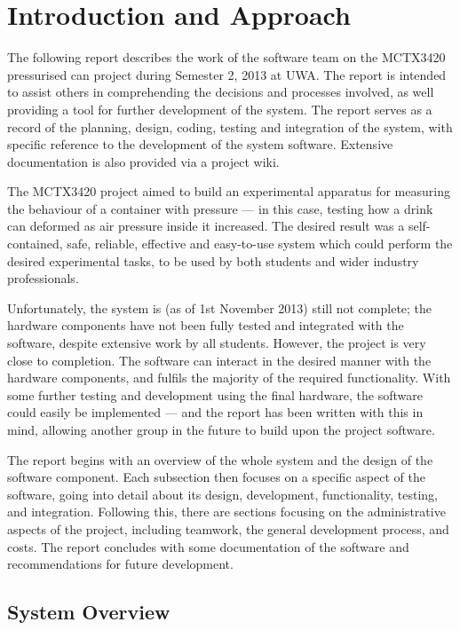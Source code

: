 \chapter{Introduction and Approach}


The following report describes the work of the software team on the MCTX3420 pressurised can project during Semester 2, 2013 at UWA. The report is intended to assist others in comprehending the decisions and processes involved, as well providing a tool for further development of the system. The report serves as a record of the planning, design, coding, testing and integration of the system, with specific reference to the development of the system software. Extensive documentation is also provided via a project wiki\cite{mctx3420_wiki}.

The MCTX3420 project aimed to build an experimental apparatus for measuring the behaviour of a container with pressure --- in this case, testing how a drink can deformed as air pressure inside it increased. The desired result was a self-contained, safe, reliable, effective and easy-to-use system which could perform the desired experimental tasks, to be used by both students and wider industry professionals.

Unfortunately, the system is (as of 1st November 2013) still not complete; the hardware components have not been fully tested and integrated with the software, despite extensive work by all students. However, the project is very close to completion. The software can interact in the desired manner with the hardware components, and fulfils the majority of the required functionality. With some further testing and development using the final hardware, the software could easily be implemented --- and the report has been written with this in mind, allowing another group in the future to build upon the project software.

The report begins with an overview of the whole system and the design of the software component. Each subsection then focuses on a specific aspect of the software, going into detail about its design, development, functionality, testing, and integration. Following this, there are sections focusing on the administrative aspects of the project, including teamwork, the general development process, and costs. The report concludes with some documentation of the software and recommendations for future development.

\section{System Overview}

